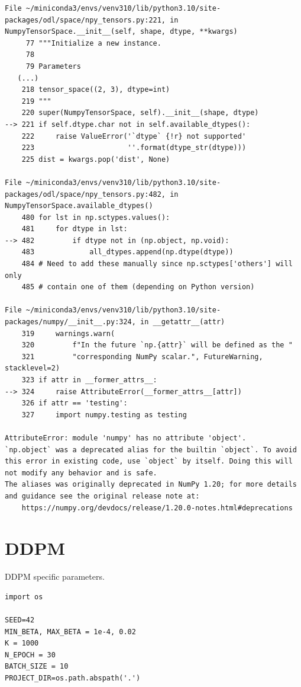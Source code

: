 \documentclass[a4paper, 11pt]{article}
\begin{document}
\begin{verbatim}
File ~/miniconda3/envs/venv310/lib/python3.10/site-packages/odl/space/npy_tensors.py:221, in NumpyTensorSpace.__init__(self, shape, dtype, **kwargs)
     77 """Initialize a new instance.
     78
     79 Parameters
   (...)
    218 tensor_space((2, 3), dtype=int)
    219 """
    220 super(NumpyTensorSpace, self).__init__(shape, dtype)
--> 221 if self.dtype.char not in self.available_dtypes():
    222     raise ValueError('`dtype` {!r} not supported'
    223                      ''.format(dtype_str(dtype)))
    225 dist = kwargs.pop('dist', None)

File ~/miniconda3/envs/venv310/lib/python3.10/site-packages/odl/space/npy_tensors.py:482, in NumpyTensorSpace.available_dtypes()
    480 for lst in np.sctypes.values():
    481     for dtype in lst:
--> 482         if dtype not in (np.object, np.void):
    483             all_dtypes.append(np.dtype(dtype))
    484 # Need to add these manually since np.sctypes['others'] will only
    485 # contain one of them (depending on Python version)

File ~/miniconda3/envs/venv310/lib/python3.10/site-packages/numpy/__init__.py:324, in __getattr__(attr)
    319     warnings.warn(
    320         f"In the future `np.{attr}` will be defined as the "
    321         "corresponding NumPy scalar.", FutureWarning, stacklevel=2)
    323 if attr in __former_attrs__:
--> 324     raise AttributeError(__former_attrs__[attr])
    326 if attr == 'testing':
    327     import numpy.testing as testing

AttributeError: module 'numpy' has no attribute 'object'.
`np.object` was a deprecated alias for the builtin `object`. To avoid this error in existing code, use `object` by itself. Doing this will not modify any behavior and is safe.
The aliases was originally deprecated in NumPy 1.20; for more details and guidance see the original release note at:
    https://numpy.org/devdocs/release/1.20.0-notes.html#deprecations
\end{verbatim}

\section{DDPM}
\label{sec:orgc9cdca0}
DDPM specific parameters.
\begin{verbatim}
import os

SEED=42
MIN_BETA, MAX_BETA = 1e-4, 0.02
K = 1000
N_EPOCH = 30
BATCH_SIZE = 10
PROJECT_DIR=os.path.abspath('.')
\end{verbatim}
\end{document}
